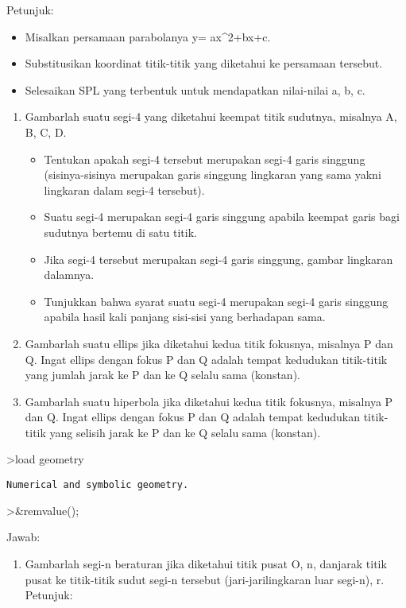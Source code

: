 \documentclass[
]{book}
\providecommand{\tightlist}{%
  \setlength{\itemsep}{0pt}\setlength{\parskip}{0pt}}
\begin{document}
Petunjuk:

\begin{itemize}
\item
  Misalkan persamaan parabolanya y= ax\^{}2+bx+c.
\item
  Substitusikan koordinat titik-titik yang diketahui ke persamaan tersebut.
\item
  Selesaikan SPL yang terbentuk untuk mendapatkan nilai-nilai a, b, c.
\end{itemize}

\begin{enumerate}
\def\labelenumi{\arabic{enumi}.}
\setcounter{enumi}{2}
\item
  Gambarlah suatu segi-4 yang diketahui keempat titik sudutnya, misalnya A, B, C, D.

  \begin{itemize}
  \item
    Tentukan apakah segi-4 tersebut merupakan segi-4 garis singgung (sisinya-sisinya merupakan garis singgung lingkaran yang sama yakni lingkaran dalam segi-4 tersebut).
  \item
    Suatu segi-4 merupakan segi-4 garis singgung apabila keempat garis bagi sudutnya bertemu di satu titik.
  \item
    Jika segi-4 tersebut merupakan segi-4 garis singgung, gambar lingkaran dalamnya.
  \item
    Tunjukkan bahwa syarat suatu segi-4 merupakan segi-4 garis singgung apabila hasil kali panjang sisi-sisi yang berhadapan sama.
  \end{itemize}
\item
  Gambarlah suatu ellips jika diketahui kedua titik fokusnya, misalnya P dan Q. Ingat ellips dengan fokus P dan Q adalah tempat kedudukan titik-titik yang jumlah jarak ke P dan ke Q selalu sama (konstan).
\item
  Gambarlah suatu hiperbola jika diketahui kedua titik fokusnya, misalnya P dan Q. Ingat ellips dengan fokus P dan Q adalah tempat kedudukan titik-titik yang selisih jarak ke P dan ke Q selalu sama (konstan).
\end{enumerate}

\textgreater load geometry

\begin{verbatim}
Numerical and symbolic geometry.
\end{verbatim}

\textgreater\&remvalue();

Jawab:

\begin{enumerate}
\def\labelenumi{\arabic{enumi}.}
\tightlist
\item
  Gambarlah segi-n beraturan jika diketahui titik pusat O, n, danjarak titik pusat ke titik-titik sudut segi-n tersebut (jari-jarilingkaran luar segi-n), r. Petunjuk:
\end{enumerate}
\end{document}
